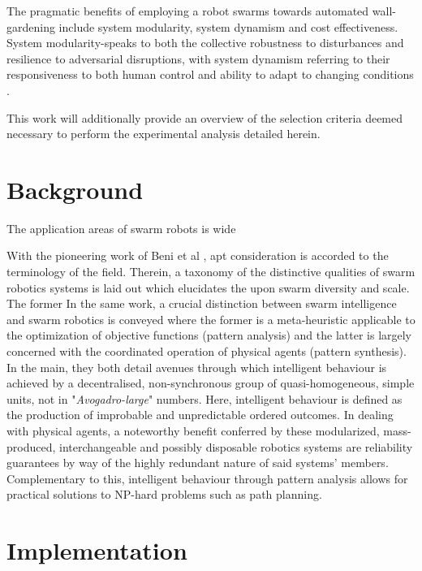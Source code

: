 \documentclass{report}
\begin{document}
The pragmatic benefits of employing a robot swarms towards automated wall-gardening include system modularity, system dynamism and cost effectiveness. System modularity-speaks to both the collective robustness to disturbances and resilience to adversarial disruptions, with system dynamism referring to their responsiveness to both human control and ability to adapt to changing conditions \cite{Yang2018}.

This work will additionally provide an overview of the selection criteria deemed necessary to perform the experimental analysis detailed herein.

\chapter{Background}
The application areas of swarm robots is wide 

With the pioneering work of Beni et al \cite{Beni2005a}, apt consideration is accorded to the terminology of the field. Therein, a taxonomy of the distinctive qualities of swarm robotics systems is laid out which elucidates the upon swarm diversity and scale. The former   In the same work, a crucial distinction between swarm intelligence and swarm robotics is conveyed where the former is a meta-heuristic applicable to the optimization of objective functions (pattern analysis) and the latter is largely concerned with the coordinated operation of physical agents (pattern synthesis). In the main, they both detail avenues through which intelligent behaviour is achieved by a decentralised, non-synchronous group of quasi-homogeneous, simple units, not in "\textit{Avogadro-large}" numbers. Here, intelligent behaviour is defined as the production of improbable and unpredictable ordered outcomes. In dealing with physical agents, a noteworthy benefit conferred by these modularized, mass-produced, interchangeable and possibly disposable robotics systems are reliability guarantees by way of the highly redundant nature of said systems' members. Complementary to this, intelligent behaviour through pattern analysis allows for practical solutions to NP-hard problems such as path planning.

\chapter{Implementation}
\end{document}
